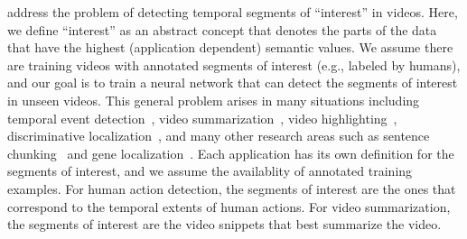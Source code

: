 \documentclass[10pt,journal,compsoc]{IEEEtran}
\begin{document}
% 
% 
% 
% 

 

 address the problem of detecting temporal segments of ``interest'' in videos. Here, we define ``interest'' as an abstract concept that denotes the parts of the data that have the highest (application dependent) semantic values. We assume there are training videos with annotated segments of interest (e.g., labeled by humans), and our goal is to train a neural network that can detect the segments of interest in unseen videos. This general problem arises in many situations including temporal event detection~\cite{Hoai-et-al-CVPR11,Hoai-DelaTorre-IJCV14}, video summarization~\cite{zhang2016video,zhou2017deep,zhang2018retrospective}, video highlighting~\cite{yang2015unsupervised,sun2014ranking}, discriminative localization~\cite{Nguyen-et-al-ICCV09, Hoai-et-al-PR14}, and many other research areas such as sentence chunking~\cite{peng2015named} and gene localization~\cite{kelley2018sequential}. Each application has its own definition for the segments of interest, and we assume the availablity of annotated training examples.  For human action detection, the segments of interest are the ones that correspond to the temporal extents of human actions. For video summarization, the segments of interest are the video snippets that best summarize the video. 
\end{document}
